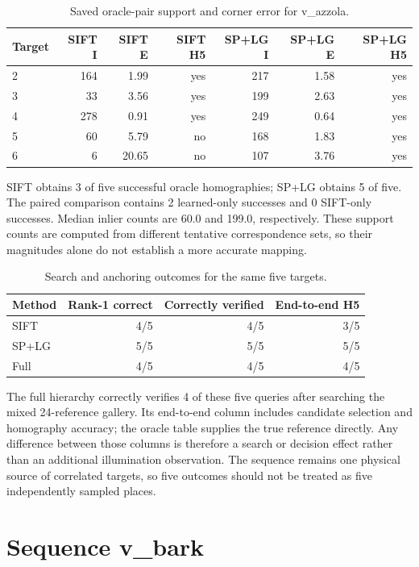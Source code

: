 \begin{table}[H]\centering\small
\caption{Saved oracle-pair support and corner error for v\_azzola.}\label{tab:hp-pairs-17}
\begin{tabular}{lrrrrrr}\toprule
Target & SIFT I & SIFT E & SIFT H5 & SP+LG I & SP+LG E & SP+LG H5 \\
\midrule
2 & 164 & 1.99 & yes & 217 & 1.58 & yes \\
3 & 33 & 3.56 & yes & 199 & 2.63 & yes \\
4 & 278 & 0.91 & yes & 249 & 0.64 & yes \\
5 & 60 & 5.79 & no & 168 & 1.83 & yes \\
6 & 6 & 20.65 & no & 107 & 3.76 & yes \\
\bottomrule\end{tabular}\end{table}


SIFT obtains 3 of five successful oracle homographies; SP+LG obtains 5 of five. The paired comparison contains 2 learned-only successes and 0 SIFT-only successes. Median inlier counts are 60.0 and 199.0, respectively. These support counts are computed from different tentative correspondence sets, so their magnitudes alone do not establish a more accurate mapping.

\begin{table}[H]\centering\small
\caption{Search and anchoring outcomes for the same five targets.}\label{tab:hp-end-17}
\begin{tabular}{lrrr}\toprule
Method & Rank-1 correct & Correctly verified & End-to-end H5 \\
\midrule
SIFT & 4/5 & 4/5 & 3/5 \\
SP+LG & 5/5 & 5/5 & 5/5 \\
Full & 4/5 & 4/5 & 4/5 \\
\bottomrule\end{tabular}\end{table}


The full hierarchy correctly verifies 4 of these five queries after searching the mixed 24-reference gallery. Its end-to-end column includes candidate selection and homography accuracy; the oracle table supplies the true reference directly. Any difference between those columns is therefore a search or decision effect rather than an additional illumination observation. The sequence remains one physical source of correlated targets, so five outcomes should not be treated as five independently sampled places.

\section{Sequence v\_bark}

